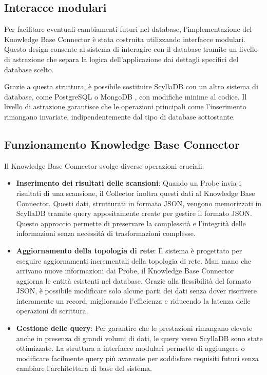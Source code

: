 \documentclass[target=bach,aauheader=,style=]{thud}
\begin{document}
\subsection{Interacce modulari}
Per facilitare eventuali cambiamenti futuri nel database, l’implementazione del Knowledge Base Connector è stata costruita utilizzando interfacce modulari. Questo design consente al sistema di interagire con il database tramite un livello di astrazione che separa la logica dell'applicazione dai dettagli specifici del database scelto.

Grazie a questa struttura, è possibile sostituire ScyllaDB con un altro sistema di database, come PostgreSQL \cite{postgresql2024} o MongoDB \cite{mongodb2024}, con modifiche minime al codice. Il livello di astrazione garantisce che le operazioni principali come l’inserimento rimangano invariate, indipendentemente dal tipo di database sottostante.

\subsection{Funzionamento Knowledge Base Connector}
Il Knowledge Base Connector svolge diverse operazioni cruciali:

\begin{itemize}
  \item \textbf{Inserimento dei risultati delle scansioni}: Quando un Probe invia i risultati di una scansione, il Collector inoltra questi dati al Knowledge Base Connector. Questi dati, strutturati in formato JSON, vengono memorizzati in ScyllaDB tramite query appositamente create per gestire il formato JSON. Questo approccio permette di preservare la complessità e l'integrità delle informazioni senza necessità di trasformazioni complesse.
  \item \textbf{Aggiornamento della topologia di rete}: Il sistema è progettato per eseguire aggiornamenti incrementali della topologia di rete. Man mano che arrivano nuove informazioni dai Probe, il Knowledge Base Connector aggiorna le entità esistenti nel database. Grazie alla flessibilità del formato JSON, è possibile modificare solo alcune parti dei dati senza dover riscrivere interamente un record, migliorando l'efficienza e riducendo la latenza delle operazioni di scrittura.
  \item \textbf{Gestione delle query}: Per garantire che le prestazioni rimangano elevate anche in presenza di grandi volumi di dati, le query verso ScyllaDB sono state ottimizzate. La struttura a interfacce modulari permette di aggiungere o modificare facilmente query più avanzate per soddisfare requisiti futuri senza cambiare l'architettura di base del sistema.
\end{itemize}
\end{document}
